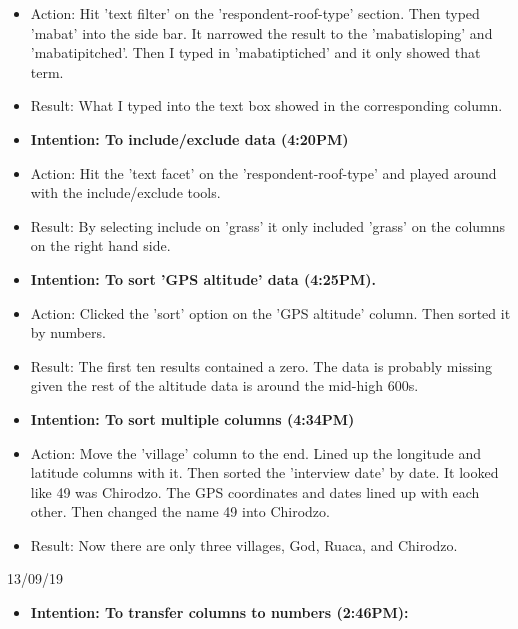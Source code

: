 \documentclass[a4paper,12pt]{article}
\begin{document}
\begin{itemize}
\begin{itemize}
\item Action: Hit 'text filter' on the 'respondent-roof-type' section. Then typed 'mabat' into the side bar. It narrowed the result to the 'mabatisloping' and 'mabatipitched'. Then I typed in 'mabatiptiched' and it only showed that term. 


\item Result: What I typed into the text box showed in the corresponding column. 


\item \textbf {Intention: To include/exclude data (4:20PM)}


\item Action: Hit the 'text facet' on the 'respondent-roof-type' and played around with the include/exclude tools.


\item Result: By selecting include on 'grass' it only included 'grass' on the columns on the right hand side.


\item \textbf{Intention: To sort 'GPS altitude' data (4:25PM).}


\item Action: Clicked the 'sort' option on the 'GPS altitude' column. Then sorted it by numbers.


\item Result: The first ten results contained a zero. The data is probably missing given the rest of the altitude data is around the mid-high 600s. 


\item \textbf{Intention: To sort multiple columns (4:34PM) }


\item Action: Move the 'village' column to the end. Lined up the longitude and latitude columns with it. Then sorted the 'interview date' by date. It looked like 49 was Chirodzo. The GPS coordinates and dates lined up with each other. Then changed the name 49 into Chirodzo. 


\item Result: Now there are only three villages, God, Ruaca, and Chirodzo. 


\end{itemize}

13/09/19

\begin{itemize}


\item \textbf{Intention: To transfer columns to numbers (2:46PM):}



\end{itemize}
\end{itemize}
\end{document}
